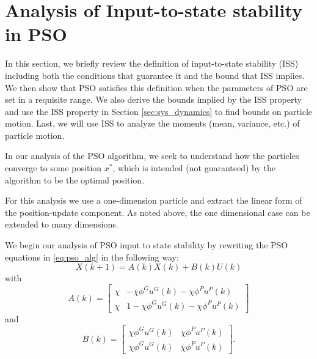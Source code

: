 \documentclass{sig-alternate}
\begin{document}
\section{Analysis of Input-to-state stability in PSO}
\label{sec:iss}

In this section, we briefly review the definition of input-to-state stability (ISS) including both the conditions that guarantee it and the bound that ISS implies\cite{Jiang2001857}. 
We then show that PSO satisfies this definition when the parameters of PSO are
set in a requisite range. 
We also derive the bounds implied by the ISS property and
use the ISS property in Section \ref{sec:sys_dynamics} to find bounds on particle motion.
Last, we will use ISS to analyze the moments (mean, variance, etc.) of particle motion.

In our analysis of the PSO algorithm, we seek to understand how the particles converge to some position $ x^{*} $, which is intended (not guaranteed) by the algorithm to be the optimal position.

For this analysis we use a one-dimension particle and extract the linear form of the position-update component. As noted above, the one dimensional case can be extended to many dimensions.

We begin our analysis of PSO input to state stability by rewriting the PSO equations in \eqref{eq:pso_alg} in the following way:
\begin{equation}
\label{eq:pso_up_linalg_simp}
X(k+1) = A(k) X(k) + B(k) U(k)
\end{equation}
with
\begin{equation}
\nonumber
A(k) = \begin{bmatrix}
\chi & - \chi \phi^{G} u^{G}(k) - \chi \phi^{P} u^{P}(k)
\\ 
\chi & 1 - \chi \phi^{G} u^{G}(k) - \chi \phi^{P} u^{P}(k)
\end{bmatrix} 
\end{equation}
and
\begin{equation}
\nonumber
B(k) = \begin{bmatrix}
\chi \phi^{G} u^{G}(k) & \chi \phi^{P} u^{P}(k)
\\ 
\chi \phi^{G} u^{G}(k) & \chi \phi^{P} u^{P}(k)
\end{bmatrix}.
\end{equation}
\end{document}

